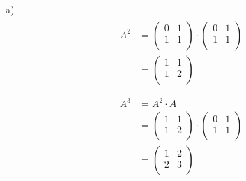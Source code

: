 \documentclass{article}
\begin{document}
a) 
\begin{gather*}
  \begin{split}
    A^2 &= \begin{pmatrix}
             0 & 1 \\
             1 & 1 \\ 
           \end{pmatrix} \cdot
           \begin{pmatrix}
             0 & 1 \\
             1 & 1 \\
           \end{pmatrix} \\
        &= \begin{pmatrix}
             1 & 1 \\
             1 & 2 \\ 
           \end{pmatrix} \\
  \end{split} \\
  \begin{split}
    A^3 &= A^2 \cdot A \\
        &= \begin{pmatrix}
             1 & 1 \\
             1 & 2 \\ 
           \end{pmatrix} \cdot
           \begin{pmatrix}
             0 & 1 \\
             1 & 1 \\
           \end{pmatrix} \\
        &= \begin{pmatrix}
             1 & 2 \\
             2 & 3 \\ 
           \end{pmatrix} \\
  \end{split} \\
\end{gather*}
\end{document}
